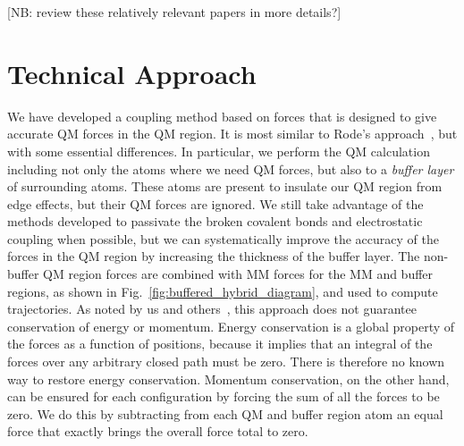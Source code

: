 \documentclass[11pt]{revtex4}
\begin{document}
% 
% 
% 


[NB: review these relatively relevant papers in more details?]

\section{Technical Approach}

We have developed a coupling method based on forces that is designed
to give accurate QM forces in the QM region.  It is most similar
to Rode's approach~\cite{kerdcharoen_chem_phys_1996a}, but with
some essential differences.  In particular, we perform the QM
calculation including not only the atoms where we need QM forces,
but also to a {\em buffer layer} of surrounding atoms.  These atoms
are present to insulate our QM region from edge effects, but their
QM forces are ignored.  We still take advantage of the methods
developed to passivate the broken covalent bonds and electrostatic
coupling when possible, but we can systematically improve the
accuracy of the forces in the QM region by increasing the thickness
of the buffer layer.  The non-buffer QM region forces are combined
with MM forces for the MM and buffer regions, as shown in
Fig.~\ref{fig:buffered_hybrid_diagram}, and used to compute
trajectories.  As noted by us and
others~\cite{heyden_j_phys_chem_b_2007a,bernstein_rep_prog_phys_2009a},
this approach does not guarantee conservation of energy or momentum.
Energy conservation is a global property of the forces as a function
of positions, because it implies that an integral of the forces
over any arbitrary closed path must be zero.  There is therefore
no known way to restore energy conservation.  Momentum conservation,
on the other hand, can be ensured for each configuration by forcing
the sum of all the forces to be zero.  We do this by subtracting
from each QM and buffer region atom an equal force that exactly
brings the overall force total to zero.
\end{document}
